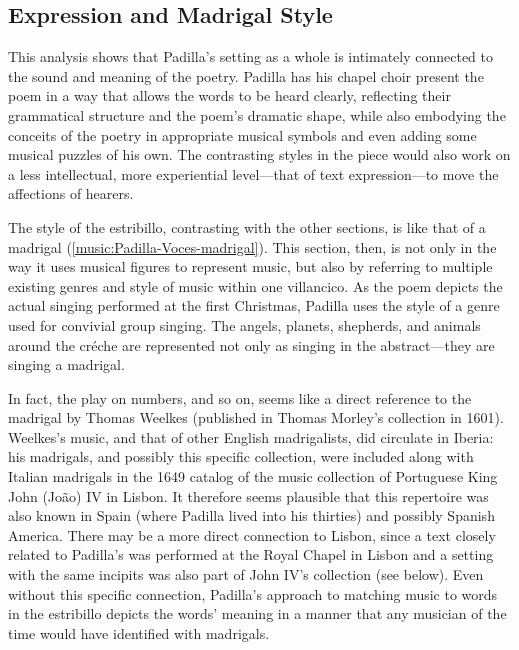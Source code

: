 \subsection{Expression and Madrigal Style}

This analysis shows that Padilla's setting as a whole is intimately connected to
the sound and meaning of the poetry.
Padilla has his chapel choir present the poem in a way that allows the words to
be heard clearly, reflecting their grammatical structure and the poem's dramatic
shape, while also embodying the conceits of the poetry in appropriate musical
symbols and even adding some musical puzzles of his own.
The contrasting styles in the piece would also work on a less intellectual, more
experiential level---that of text expression---to move the affections of
hearers.

The style of the estribillo, contrasting with the other sections, is like that
of a madrigal (\cref{music:Padilla-Voces-madrigal}).
This section, then, is  not only in the way it uses
musical figures to represent music, but also by referring to multiple existing
genres and style of music within one villancico.
As the poem depicts the actual singing performed at the first Christmas, Padilla
uses the style of a genre used for convivial group singing.
The angels, planets, shepherds, and animals around the créche are represented
not only as singing in the abstract---they are singing a madrigal.

In fact, the play on numbers,  and so on, seems like a
direct reference to the madrigal  by Thomas Weelkes (published in Thomas Morley's collection
 in 1601).
Weelkes's music, and that of other English madrigalists, did circulate in
Iberia: his madrigals, and possibly this specific collection, were included
along with Italian madrigals in the 1649 catalog of the music collection of
Portuguese King John (João) IV in Lisbon.%
    \Autocite[, 584]{JohnIV:Catalog}
It therefore seems plausible that this repertoire was also known in Spain (where
Padilla lived into his thirties) and possibly Spanish America.
There may be a more direct connection to Lisbon, since a text closely related to
Padilla's  was performed at the Royal Chapel in Lisbon and a
setting with the same incipits was also part of John IV's collection (see
below).
Even without this specific connection, Padilla's approach to matching music to
words in the estribillo depicts the words' meaning in a manner that any musician
of the time would have identified with madrigals.

